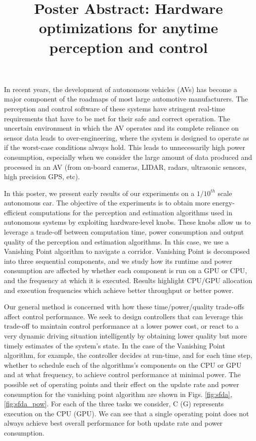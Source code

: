 \documentclass[10pt, conference, compsocconf]{IEEEtran}
\title{\LARGE \bf
	Poster Abstract: Hardware optimizations for anytime perception and control
}
\author{\IEEEauthorblockN{Nischal K.N.$^1$, Paritosh Kelkar$^1$, Dhruva Kumar$^1$, Yash Vardhan Pant$^1$, \\
Houssam Abbas$^1$, Joseph Devietti$^2$, Rahul Mangharam$^1$}
\IEEEauthorblockA{$^1$The Department of Electrical and Systems Engineering, \\
$^2$ The Department of Computer and Information Sciences
University of Pennsylvania, \\
Philadelphia, U.S.A\\}
}
\begin{document}
	
\maketitle
\thispagestyle{empty}
\pagestyle{empty}

In recent years, the development of autonomous vehicles (AVs) has become a major component of the roadmaps of most large automotive manufacturers. 
The perception and control software of these systems have stringent real-time requirements that have to be met for their safe and correct operation.
The uncertain environment in which the AV operates and its complete reliance on sensor data leads to over-engineering, where the system is designed to operate as if the worst-case conditions always hold.
This leads to unnecessarily high power consumption, especially when we consider the large amount of data produced and processed in an AV (from on-board cameras, LIDAR, radars, ultrasonic sensors, high precision GPS, etc). 

In this poster, we present early results of our experiments on a $1/10^{th}$ scale autonomous car. 
The objective of the experiments is to obtain more energy-efficient computations for the perception and estimation algorithms used in autonomous systems by exploiting hardware-level knobs. 
These knobs allow us to leverage a trade-off between computation time, power consumption and output quality of the perception and estimation algorithms. 
In this case, we use a Vanishing Point algorithm to navigate a corridor. 
Vanishing Point is decomposed into three sequential components, and we study how its runtime and power consumption are affected by whether each component is run on a GPU or CPU, and the frequency at which it is executed.
Results highlight CPU/GPU allocation and execution frequencies which achieve better throughput or better power.

Our general method is concerned with how these time/power/quality trade-offs affect control performance. 
We seek to design controllers that can leverage this trade-off to maintain control performance at a lower power cost, or react to a very dynamic driving situation intelligently by obtaining lower quality but more timely estimates of the system's state.   
In the case of the Vanishing Point algorithm, for example, the controller decides at run-time, and for each time step, whether to schedule each of the algorithms's components on the CPU or GPU and at what frequency, to achieve control performance at minimal power. The possible set of operating points and their effect on the update rate and power consumption for the vanishing point algorithm are shown in Figs. \ref{fig:sfda},\ref{fig:sfda_pow}. For each of the three tasks we consider, C (G) represents execution on the CPU (GPU). We can see that a single operating point does not always achieve best overall performance for both update rate and power consumption.
\end{document}

